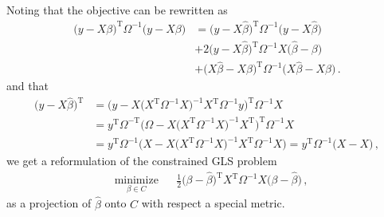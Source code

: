 \documentclass[a4paper]{article}
\newcommand{\T}{\mathrm{T}}
\begin{document}
Noting that the objective can be rewritten as
\begin{align*}
  \bigl(y - X \beta\bigr)^\T \Omega^{-1} \bigl(y - X \beta\bigr)
    &= \bigl(y - X \hat{\beta}\bigr)^\T \Omega^{-1} \bigl(y - X \hat{\beta}\bigr)
    \\
    &+ 2 \bigl(y - X \hat{\beta}\bigr)^\T \Omega^{-1} X \bigl(\hat{\beta} - \beta\bigr)
    \\
    &+ \bigl(X \hat{\beta} - X \beta\bigr)^\T \Omega^{-1} \bigl(X \hat{\beta} - X \beta\bigr)
    \,.
\end{align*}
and that
\begin{align*}
  \bigl(y - X \hat{\beta}\bigr)^\T
    &= \bigl(y - X \bigl(X^\T \Omega^{-1} X \bigr)^{-1} X^\T \Omega^{-1} y\bigr)^\T \Omega^{-1} X
    \\
    &= y^\T \Omega^{-\T} \bigl(\Omega - X \bigl(X^\T \Omega^{-1} X \bigr)^{-1} X^\T \bigr)^\T \Omega^{-1} X
    \\
    &= y^\T \Omega^{-1} \bigl(X - X \bigl(X^\T \Omega^{-1} X \bigr)^{-1} X^\T \Omega^{-1} X \bigr)
    = y^\T \Omega^{-1} \bigl(X - X\bigr)
    \,,
\end{align*}
we get a reformulation of the constrained GLS problem
\begin{equation} \label{eq:gls_proj}
  \begin{aligned}
    & \underset{\beta\in C}{\text{minimize}}
      & & \tfrac12 \bigl(\beta - \hat{\beta} \bigr)^\T X^\T \Omega^{-1} X \bigl(\beta - \hat{\beta}\bigr)
          \,,
  \end{aligned}
\end{equation}
as a projection of $\hat{\beta}$ onto $C$ with respect a special metric.

\end{document}
